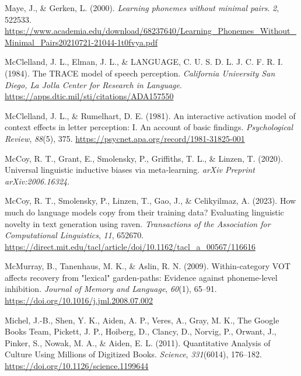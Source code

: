 \documentclass[
  12pt,
  letterpaper,
]{scrreport}
\newlength{\cslhangindent}
\newenvironment{CSLReferences}[2] %
 {\begin{list}{}{%
  \setlength{\itemindent}{0pt}
  \setlength{\leftmargin}{0pt}
  \setlength{\parsep}{0pt}
  \ifodd #1
   \setlength{\leftmargin}{\cslhangindent}
   \setlength{\itemindent}{-1\cslhangindent}
  \fi
  \setlength{\itemsep}{#2\baselineskip}}}
 {\end{list}}
\begin{document}
\begin{CSLReferences}{1}{0}
Maye, J., \& Gerken, L. (2000). \emph{Learning phonemes without minimal
pairs}. \emph{2}, 522533.
\url{https://www.academia.edu/download/68237640/Learning_Phonemes_Without_Minimal_Pairs20210721-21044-1t0fvya.pdf}

McClelland, J. L., Elman, J. L., \& LANGUAGE, C. U. S. D. L. J. C. F. R.
I. (1984). The TRACE model of speech perception. \emph{California
University San Diego, La Jolla Center for Research in Language}.
\url{https://apps.dtic.mil/sti/citations/ADA157550}

McClelland, J. L., \& Rumelhart, D. E. (1981). An interactive activation
model of context effects in letter perception: I. An account of basic
findings. \emph{Psychological Review}, \emph{88}(5), 375.
\url{https://psycnet.apa.org/record/1981-31825-001}

McCoy, R. T., Grant, E., Smolensky, P., Griffiths, T. L., \& Linzen, T.
(2020). Universal linguistic inductive biases via meta-learning.
\emph{arXiv Preprint arXiv:2006.16324}.

McCoy, R. T., Smolensky, P., Linzen, T., Gao, J., \& Celikyilmaz, A.
(2023). How much do language models copy from their training data?
Evaluating linguistic novelty in text generation using raven.
\emph{Transactions of the Association for Computational Linguistics},
\emph{11}, 652670.
\url{https://direct.mit.edu/tacl/article/doi/10.1162/tacl_a_00567/116616}

McMurray, B., Tanenhaus, M. K., \& Aslin, R. N. (2009). Within-category
VOT affects recovery from {"}lexical{"} garden-paths: Evidence against
phoneme-level inhibition. \emph{Journal of Memory and Language},
\emph{60}(1), 65--91. \url{https://doi.org/10.1016/j.jml.2008.07.002}

Michel, J.-B., Shen, Y. K., Aiden, A. P., Veres, A., Gray, M. K., The
Google Books Team, Pickett, J. P., Hoiberg, D., Clancy, D., Norvig, P.,
Orwant, J., Pinker, S., Nowak, M. A., \& Aiden, E. L. (2011).
Quantitative Analysis of Culture Using Millions of Digitized Books.
\emph{Science}, \emph{331}(6014), 176--182.
\url{https://doi.org/10.1126/science.1199644}


\end{CSLReferences}
\end{document}
